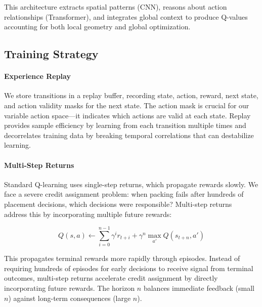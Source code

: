 
This architecture extracts spatial patterns (CNN), reasons about action relationships (Transformer), and integrates global context to produce Q-values accounting for both local geometry and global optimization.

\subsection{Training Strategy}

\paragraph{Experience Replay} We store transitions in a replay buffer, recording state, action, reward, next state, and action validity masks for the next state. The action mask is crucial for our variable action space—it indicates which actions are valid at each state. Replay provides sample efficiency by learning from each transition multiple times and decorrelates training data by breaking temporal correlations that can destabilize learning.

\paragraph{Multi-Step Returns} Standard Q-learning uses single-step returns, which propagate rewards slowly. We face a severe credit assignment problem: when packing fails after hundreds of placement decisions, which decisions were responsible? Multi-step returns~\cite{sutton2018reinforcement} address this by incorporating multiple future rewards:

\begin{equation}
Q(s, a) \leftarrow \sum_{i=0}^{n-1} \gamma^i r_{t+i} + \gamma^n \max_{a'} Q(s_{t+n}, a')
\end{equation}

This propagates terminal rewards more rapidly through episodes. Instead of requiring hundreds of episodes for early decisions to receive signal from terminal outcomes, multi-step returns accelerate credit assignment by directly incorporating future rewards. The horizon $n$ balances immediate feedback (small $n$) against long-term consequences (large $n$).

